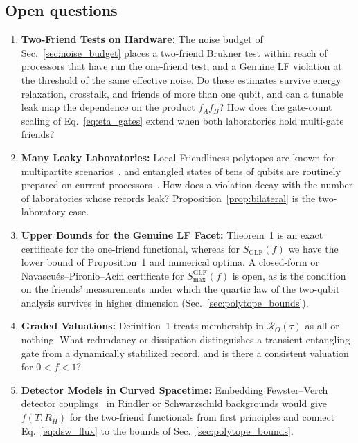 \subsection{Open questions}

\begin{enumerate}
    \item \textbf{Two-Friend Tests on Hardware:} The noise budget of Sec.~\ref{sec:noise_budget} places a two-friend Brukner test within reach of processors that have run the one-friend test, and a Genuine LF violation at the threshold of the same effective noise. Do these estimates survive energy relaxation, crosstalk, and friends of more than one qubit, and can a tunable leak map the dependence on the product $f_A f_B$? How does the gate-count scaling of Eq.~\eqref{eq:eta_gates} extend when both laboratories hold multi-gate friends?
    \item \textbf{Many Leaky Laboratories:} Local Friendliness polytopes are known for multipartite scenarios~\cite{haddara2024}, and entangled states of tens of qubits are routinely prepared on current processors~\cite{kumar2026}. How does a violation decay with the number of laboratories whose records leak? Proposition~\ref{prop:bilateral} is the two-laboratory case.
    \item \textbf{Upper Bounds for the Genuine LF Facet:} Theorem~1 is an exact certificate for the one-friend functional, whereas for $S_{\mathrm{GLF}}(f)$ we have the lower bound of Proposition~1 and numerical optima. A closed-form or Navascu\'{e}s--Pironio--Ac\'{i}n certificate for $S_{\max}^{\mathrm{GLF}}(f)$ is open, as is the condition on the friends' measurements under which the quartic law of the two-qubit analysis survives in higher dimension (Sec.~\ref{sec:polytope_bounds}).
    \item \textbf{Graded Valuations:} Definition~1 treats membership in $\mathcal{R}_O(\tau)$ as all-or-nothing. What redundancy or dissipation distinguishes a transient entangling gate from a dynamically stabilized record, and is there a consistent valuation for $0 < f < 1$?
    \item \textbf{Detector Models in Curved Spacetime:} Embedding Fewster--Verch detector couplings~\cite{fewster2020} in Rindler or Schwarzschild backgrounds would give $f(T, R_H)$ for the two-friend functionals from first principles and connect Eq.~\eqref{eq:dsw_flux} to the bounds of Sec.~\ref{sec:polytope_bounds}.
\end{enumerate}

